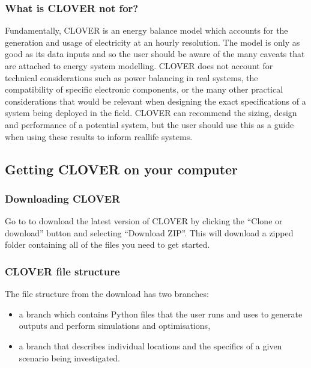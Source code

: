 \documentclass[letterpaper,10pt,english]{sphinxmanual}
\begin{document}
\subsubsection{What is CLOVER not for?}
\label{\detokenize{overview:what-is-clover-not-for}}
\sphinxAtStartPar
Fundamentally, CLOVER is an energy balance model which accounts for the
generation and usage of electricity at an hourly resolution. The model
is only as good as its data inputs and so the user should be aware of
the many caveats that are attached to energy system modelling. CLOVER
does not account for technical considerations such as power balancing in
real systems, the compatibility of specific electronic components, or
the many other practical considerations that would be relevant when
designing the exact specifications of a system being deployed in the
field. CLOVER can recommend the sizing, design and performance of a
potential system, but the user should use this as a guide when using
these results to inform real\sphinxhyphen{}life systems.


\subsection{Getting CLOVER on your computer}
\label{\detokenize{overview:getting-clover-on-your-computer}}

\subsubsection{Downloading CLOVER}
\label{\detokenize{overview:downloading-clover}}
\sphinxAtStartPar
Go to  to download the latest
version of CLOVER by clicking the “Clone or download” button and
selecting “Download ZIP”. This will download a zipped folder containing
all of the files you need to get started.


\subsubsection{CLOVER file structure}
\label{\detokenize{overview:clover-file-structure}}
\sphinxAtStartPar
The file structure from the download has two branches:
\begin{itemize}
\item {} 
\sphinxAtStartPar
a  branch which contains Python files that the user runs and uses to generate outputs and perform simulations and optimisations,

\item {} 
\sphinxAtStartPar
a  branch that describes individual locations and the specifics of a given scenario being investigated.

\end{itemize}
\end{document}
